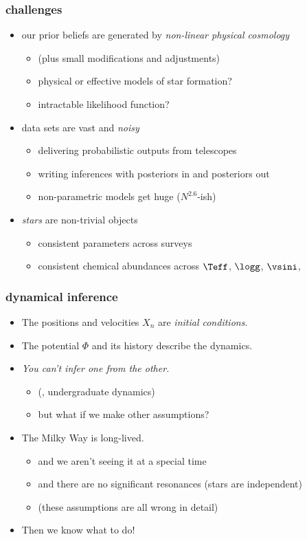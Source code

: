\documentclass[pdftex]{beamer}
\begin{document}
\begin{frame}
  \frametitle{challenges}
  \begin{itemize}
  \item our prior beliefs are generated by \emph{non-linear physical cosmology}
    \begin{itemize}
    \item (plus small modifications and adjustments)
    \item physical or effective models of star formation?
    \item intractable likelihood function?
    \end{itemize}
  \item data sets are vast and \emph{noisy}
    \begin{itemize}
    \item delivering probabilistic outputs from telescopes
    \item writing inferences with posteriors in and posteriors out
    \item non-parametric models get huge ($N^{2.6}$-ish)
    \end{itemize}
  \item \emph{stars} are non-trivial objects
    \begin{itemize}
    \item consistent parameters across surveys
    \item consistent chemical abundances across $\Teff$, $\logg$, $\vsini$, \etc
    \end{itemize}
  \end{itemize}
\end{frame}

\begin{frame}
  \frametitle{dynamical inference}
  \begin{itemize}
  \item The positions and velocities $X_n$ are \emph{initial conditions}.
  \item The potential $\Phi$ and its history describe the dynamics.
  \item \emph{You can't infer one from the other.}
    \begin{itemize}
    \item (\cf, undergraduate dynamics)
    \item<2-> but what if we make other assumptions?
    \end{itemize}
  \item<2-> The Milky Way is long-lived.
    \begin{itemize}
    \item and we aren't seeing it at a special time
    \item and there are no significant resonances (stars are independent)
    \item (these assumptions are all wrong in detail)
    \end{itemize}
  \item<2-> Then we know what to do!
  \end{itemize}
\end{frame}
\end{document}
